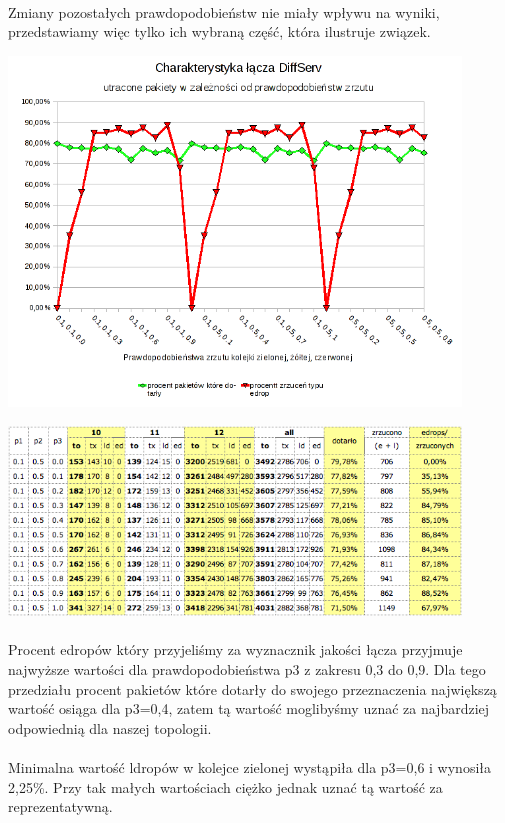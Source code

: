 \documentclass[a4paper]{article}
\begin{document}
\paragraph{}
Zmiany pozostałych prawdopodobieństw nie miały wpływu na wyniki, przedstawiamy więc tylko ich wybraną część, która ilustruje związek.


\includegraphics[width=120mm]{images/punkt_1_wykres.png}


\includegraphics[width=120mm]{images/punkt_1_tabela.png}

\paragraph{}
Procent edropów który przyjeliśmy za wyznacznik jakości łącza przyjmuje najwyższe wartości dla prawdopodobieństwa p3 z zakresu 0,3 do 0,9. Dla tego przedziału procent pakietów które dotarły do swojego przeznaczenia największą wartość osiąga dla p3=0,4, zatem tą wartość moglibyśmy uznać za najbardziej odpowiednią dla naszej topologii. 

\paragraph{}
Minimalna wartość ldropów w kolejce zielonej wystąpiła dla p3=0,6 i wynosiła 2,25\%. Przy tak małych wartościach ciężko jednak uznać tą wartość za reprezentatywną.
\end{document}

